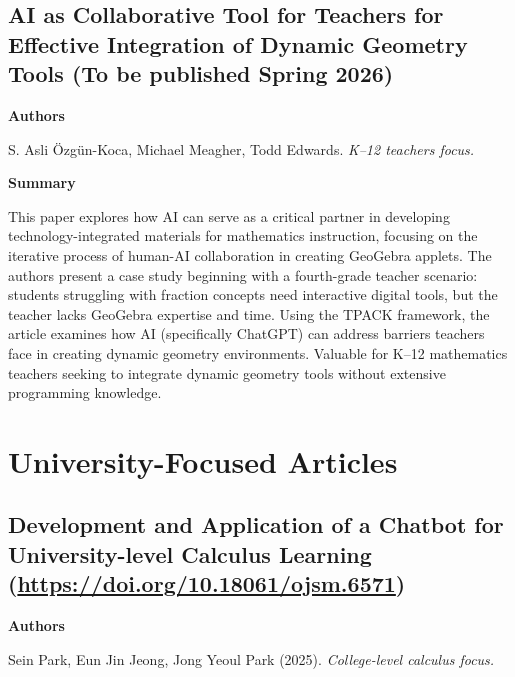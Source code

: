 \documentclass[11pt, a4paper]{article}
\newenvironment{annotation}[1]
{\par\vspace{2pt}\noindent\textbf{#1}\par\vspace{1pt}\noindent\small\ignorespaces}
{\par\vspace{3pt}}
\begin{document}
\subsection[\texorpdfstring{AI as Collaborative Tool for Teachers for Effective Integration of Dynamic Geometry Tools }{AI as Collaborative Tool for Teachers for Effective Integration of Dynamic Geometry Tools }]{AI as Collaborative Tool for Teachers for Effective Integration of Dynamic Geometry Tools (To be published Spring 2026)}

\begin{annotation}{Authors}
S. Asli Özgün-Koca, Michael Meagher, Todd Edwards. \textit{K--12 teachers focus.}
\end{annotation}

\begin{annotation}{Summary}
This paper explores how AI can serve as a critical partner in developing technology-integrated materials for mathematics instruction, focusing on the iterative process of human-AI collaboration in creating GeoGebra applets. The authors present a case study beginning with a fourth-grade teacher scenario: students struggling with fraction concepts need interactive digital tools, but the teacher lacks GeoGebra expertise and time. Using the TPACK framework, the article examines how AI (specifically ChatGPT) can address barriers teachers face in creating dynamic geometry environments. Valuable for K--12 mathematics teachers seeking to integrate dynamic geometry tools without extensive programming knowledge.
\end{annotation}

\section{University-Focused Articles}

\subsection[\texorpdfstring{Development and Application of a Chatbot for University-level Calculus Learning }{Development and Application of a Chatbot for University-level Calculus Learning }]{Development and Application of a Chatbot for University-level Calculus Learning (\texorpdfstring{\url{https://doi.org/10.18061/ojsm.6571}}{})}

\begin{annotation}{Authors}
Sein Park, Eun Jin Jeong, Jong Yeoul Park (2025). \textit{College-level calculus focus.}
\end{annotation}
\end{document}

